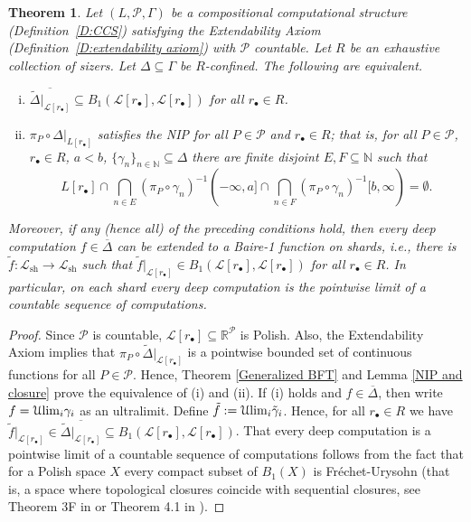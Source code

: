 \documentclass[psamsfonts]{amsart}
\newtheorem{thm}{Theorem}[section]
\theoremstyle{definition}
\theoremstyle{remark}
\numberwithin{equation}{section}
\begin{document}
\begin{thm}\label{nip-baire1def}
    Let $(L,\mathcal{P},\Gamma)$ be a compositional computational structure (Definition~\ref{D:CCS}) satisfying the Extendability Axiom (Definition~\ref{D:extendability axiom}) with $\mathcal{P}$ countable.
Let $R$ be an exhaustive collection of sizers.
Let $\Delta\subseteq\Gamma$ be $R$-confined.
The following are equivalent.

    \begin{enumerate}[(i)]
        \item $\overline{\tilde\Delta|_{\mathcal{L}[r_\bullet]}}\subseteq B_1(\mathcal{L}[r_\bullet],\mathcal{L}[r_\bullet])$ for all $r_\bullet\in R$.
        \item $\pi_P\circ \Delta|_{L[r_\bullet]}$ satisfies the NIP for all $P\in\mathcal{P}$ and $r_\bullet\in R$; that is, for all $P\in\mathcal{P}$, $r_\bullet\in R$, $a<b$, $\{\gamma_n\}_{n\in\mathbb{N}}\subseteq\Delta$ there are finite disjoint $E,F\subseteq\mathbb{N}$ such that $$L[r_\bullet]\cap\bigcap_{n\in E}(\pi_P\circ\gamma_n)^{-1}(-\infty,a]\cap\bigcap_{n\in F}(\pi_P\circ\gamma_n)^{-1}[b,\infty)=\emptyset.$$
    \end{enumerate}

    Moreover, if any (hence all) of the preceding conditions hold, then every deep computation $f\in\overline{\Delta}$ can be extended to a Baire-1 function on shards, i.e., there is $\tilde f:\mathcal{L}_{\text{sh}}\rightarrow \mathcal{L}_{\text{sh}}$ such that $\tilde f|_{\mathcal{L}[r_\bullet]}\in B_1(\mathcal{L}[r_\bullet],\mathcal{L}[r_\bullet])$ for all $r_{\bullet}\in R$.
In particular, on each shard every deep computation is the pointwise limit of a countable sequence of computations.
\end{thm}

\begin{proof}
    Since $\mathcal{P}$ is countable, $\mathcal{L}[r_\bullet]\subseteq\mathbb{R}^\mathcal{P}$ is Polish.
Also, the Extendability Axiom implies that $\pi_P\circ \tilde\Delta|_{\mathcal{L}[r_\bullet]}$ is a pointwise bounded set of continuous functions for all $P\in\mathcal{P}$.
Hence, Theorem \ref{Generalized BFT} and Lemma \ref{NIP and closure} prove the equivalence of (i) and (ii).
If (i) holds and $f\in\overline{\Delta}$, then write $f=\mathcal{U}{\rm lim}_i \gamma_i$ as an ultralimit.
Define $\tilde f:=\mathcal{U}{\rm lim}_i \tilde\gamma_i$.
Hence, for all $r_\bullet\in R$ we have $\tilde f|_{\mathcal{L}[r_\bullet]}\in\overline{\tilde\Delta|_{\mathcal{L}[r_\bullet]}}\subseteq B_1(\mathcal{L}[r_\bullet],\mathcal{L}[r_\bullet])$.
That every deep computation is a pointwise limit of a countable sequence of computations follows from the fact that for a Polish space $X$ every compact subset of $B_1(X)$ is Fréchet-Urysohn (that is, a space where topological closures coincide with sequential closures, see Theorem 3F in \cite{BFT_1978_PCompactBaire} or Theorem 4.1 in \cite{debs2013rosenthal}).
\end{proof}
\end{document}

